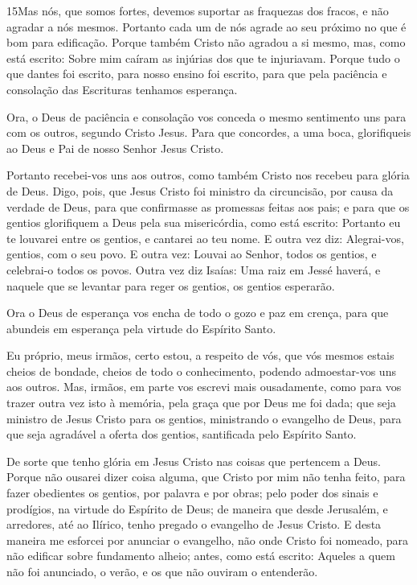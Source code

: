 \medskip

\lettrine{15} Mas nós, que somos fortes, devemos suportar as
fraquezas dos fracos, e não agradar a nós mesmos. Portanto cada
um de nós agrade ao seu próximo no que é bom para edificação.
Porque também Cristo não agradou a si mesmo, mas, como está
escrito: Sobre mim caíram as injúrias dos que te injuriavam.
Porque tudo o que dantes foi escrito, para nosso ensino foi
escrito, para que pela paciência e consolação das Escrituras
tenhamos esperança.

Ora, o Deus de paciência e consolação vos conceda o mesmo
sentimento uns para com os outros, segundo Cristo Jesus. Para
que concordes, a uma boca, glorifiqueis ao Deus e Pai de nosso
Senhor Jesus Cristo.

Portanto recebei-vos uns aos outros, como também Cristo nos
recebeu para glória de Deus. Digo, pois, que Jesus Cristo foi
ministro da circuncisão, por causa da verdade de Deus, para que
confirmasse as promessas feitas aos pais; e para que os gentios
glorifiquem a Deus pela sua misericórdia, como está escrito:
Portanto eu te louvarei entre os gentios, e cantarei ao teu nome.
E outra vez diz: Alegrai-vos, gentios, com o seu povo.
E outra vez: Louvai ao Senhor, todos os gentios, e celebrai-o
todos os povos. Outra vez diz Isaías: Uma raiz em Jessé
haverá, e naquele que se levantar para reger os gentios, os gentios
esperarão.

Ora o Deus de esperança vos encha de todo o gozo e paz em crença,
para que abundeis em esperança pela virtude do Espírito Santo.

Eu próprio, meus irmãos, certo estou, a respeito de vós, que vós
mesmos estais cheios de bondade, cheios de todo o conhecimento,
podendo admoestar-vos uns aos outros. Mas, irmãos, em parte
vos escrevi mais ousadamente, como para vos trazer outra vez isto à
memória, pela graça que por Deus me foi dada; que seja
ministro de Jesus Cristo para os gentios, ministrando o evangelho de
Deus, para que seja agradável a oferta dos gentios, santificada pelo
Espírito Santo.

De sorte que tenho glória em Jesus Cristo nas coisas que
pertencem a Deus. Porque não ousarei dizer coisa alguma, que
Cristo por mim não tenha feito, para fazer obedientes os gentios,
por palavra e por obras; pelo poder dos sinais e prodígios,
na virtude do Espírito de Deus; de maneira que desde Jerusalém, e
arredores, até ao Ilírico, tenho pregado o evangelho de Jesus
Cristo. E desta maneira me esforcei por anunciar o evangelho,
não onde Cristo foi nomeado, para não edificar sobre fundamento
alheio; antes, como está escrito: Aqueles a quem não foi
anunciado, o verão, e os que não ouviram o entenderão.

